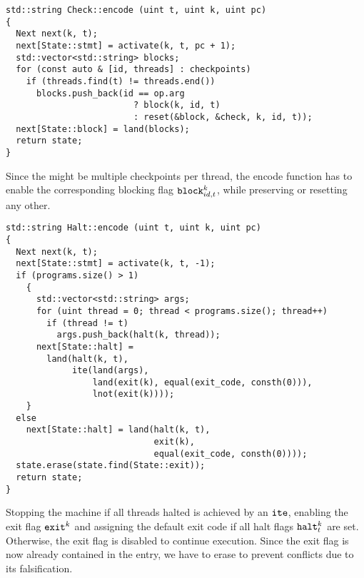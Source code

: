 
\begin{lstlisting}[style=c++, style=encode]
std::string Check::encode (uint t, uint k, uint pc)
{
  Next next(k, t);
  next[State::stmt] = activate(k, t, pc + 1);
  std::vector<std::string> blocks;
  for (const auto & [id, threads] : checkpoints)
    if (threads.find(t) != threads.end())
      blocks.push_back(id == op.arg
                         ? block(k, id, t)
                         : reset(&block, &check, k, id, t));
  next[State::block] = land(blocks);
  return state;
}
\end{lstlisting}

\noindent
Since the might be multiple checkpoints per thread, the encode function
has to enable the corresponding blocking flag $\texttt{block}^k_{id, t}$, while preserving or resetting any other.


\newpage

\begin{lstlisting}[style=c++, style=encode]
std::string Halt::encode (uint t, uint k, uint pc)
{
  Next next(k, t);
  next[State::stmt] = activate(k, t, -1);
  if (programs.size() > 1)
    {
      std::vector<std::string> args;
      for (uint thread = 0; thread < programs.size(); thread++)
        if (thread != t)
          args.push_back(halt(k, thread));
      next[State::halt] =
        land(halt(k, t),
             ite(land(args),
                 land(exit(k), equal(exit_code, consth(0))),
                 lnot(exit(k))));
    }
  else
    next[State::halt] = land(halt(k, t),
                             exit(k),
                             equal(exit_code, consth(0))));
  state.erase(state.find(State::exit));
  return state;
}
\end{lstlisting}

\noindent
Stopping the machine if all threads halted is achieved by an $\texttt{ite}$, enabling the exit flag $\texttt{exit}^k$ and assigning the default exit code if all halt flags $\texttt{halt}^k_t$ are set.
Otherwise, the exit flag is disabled to continue execution.
Since the exit flag is now already contained in the  entry, we have to erase  to prevent conflicts due to its falsification. %

